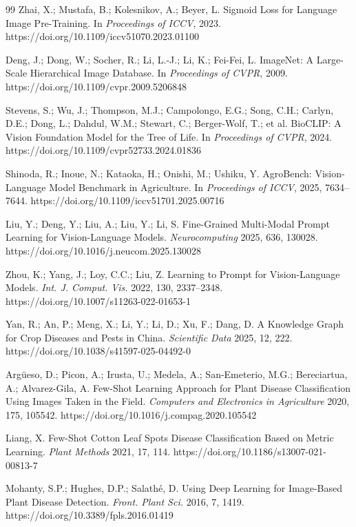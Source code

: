 \documentclass[10pt,a4paper]{article}
\begin{document}
\begin{thebibliography}{99}
Zhai, X.; Mustafa, B.; Kolesnikov, A.; Beyer, L.
Sigmoid Loss for Language Image Pre-Training.
In \emph{Proceedings of ICCV}, 2023.
https://doi.org/10.1109/iccv51070.2023.01100

Deng, J.; Dong, W.; Socher, R.; Li, L.-J.; Li, K.; Fei-Fei, L.
ImageNet: A Large-Scale Hierarchical Image Database.
In \emph{Proceedings of CVPR}, 2009.
https://doi.org/10.1109/cvpr.2009.5206848

Stevens, S.; Wu, J.; Thompson, M.J.; Campolongo, E.G.; Song, C.H.; Carlyn, D.E.; Dong, L.; Dahdul, W.M.; Stewart, C.; Berger-Wolf, T.; et al.
BioCLIP: A Vision Foundation Model for the Tree of Life.
In \emph{Proceedings of CVPR}, 2024.
https://doi.org/10.1109/cvpr52733.2024.01836

Shinoda, R.; Inoue, N.; Kataoka, H.; Onishi, M.; Ushiku, Y.
AgroBench: Vision-Language Model Benchmark in Agriculture.
In \emph{Proceedings of ICCV}, 2025, 7634--7644.
https://doi.org/10.1109/iccv51701.2025.00716

Liu, Y.; Deng, Y.; Liu, A.; Liu, Y.; Li, S.
Fine-Grained Multi-Modal Prompt Learning for Vision-Language Models.
\emph{Neurocomputing} 2025, 636, 130028.
https://doi.org/10.1016/j.neucom.2025.130028

Zhou, K.; Yang, J.; Loy, C.C.; Liu, Z.
Learning to Prompt for Vision-Language Models.
\emph{Int. J. Comput. Vis.} 2022, 130, 2337--2348.
https://doi.org/10.1007/s11263-022-01653-1

Yan, R.; An, P.; Meng, X.; Li, Y.; Li, D.; Xu, F.; Dang, D.
A Knowledge Graph for Crop Diseases and Pests in China.
\emph{Scientific Data} 2025, 12, 222.
https://doi.org/10.1038/s41597-025-04492-0

Argüeso, D.; Picon, A.; Irusta, U.; Medela, A.; San-Emeterio, M.G.; Bereciartua, A.; Alvarez-Gila, A.
Few-Shot Learning Approach for Plant Disease Classification Using Images Taken in the Field.
\emph{Computers and Electronics in Agriculture} 2020, 175, 105542.
https://doi.org/10.1016/j.compag.2020.105542

Liang, X.
Few-Shot Cotton Leaf Spots Disease Classification Based on Metric Learning.
\emph{Plant Methods} 2021, 17, 114.
https://doi.org/10.1186/s13007-021-00813-7

Mohanty, S.P.; Hughes, D.P.; Salathé, D.
Using Deep Learning for Image-Based Plant Disease Detection.
\emph{Front. Plant Sci.} 2016, 7, 1419.
https://doi.org/10.3389/fpls.2016.01419


\end{thebibliography}
\end{document}
